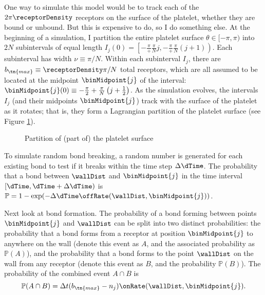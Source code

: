 One way to simulate this model would be to track each of the
$2\pi \receptorDensity$ receptors on the surface of the platelet,
whether they are bound or unbound. But this is expensive to do, so I
do something else. At the beginning of a simulation, I partition the
entire platelet surface $\theta \in [-\pi, \pi)$ into $2N$
subintervals of equal length
$I_j(0) = \left[-\frac{\pi} + \frac{\pi}{N}j, -\frac{\pi} +
  \frac{\pi}{N} (j+1)\right)$. Each subinterval has width
$\nu \equiv \pi/N$. Within each subinterval $I_j$, there are
$b_\tn{max} \equiv \receptorDensity \pi/N$ total receptors, which are
all assumed to be located at the midpoint $\binMidpoint{j}$ of the
interval:
$\binMidpoint{j}(0) \equiv -\frac{\pi}{2} + \frac{\pi}{N} \left( j +
  \frac{1}{2} \right)$. As the simulation evolves, the intervals $I_j$
(and their midpoints $\binMidpoint{j}$) track with the surface of the
platelet as it rotates; that is, they form a Lagrangian partition of
the platelet surface (see Figure \ref{fig:plt-bins}).

\begin{figure}
  \centering
  
  \caption{Partition of (part of) the platelet surface}
  \label{fig:plt-bins}
\end{figure}

To simulate random bond breaking, a random number is generated for
each existing bond to test if it breaks within the time step
$\Delta \dTime$. The probability that a bond between $\wallDist$ and
$\binMidpoint{j}$ in the time interval $[\dTime, \dTime + \Delta \dTime)$
is $\mathbb{P} = 1 - \exp(-\Delta \dTime \offRate(\wallDist,
\binMidpoint{j}))$.

Next look at bond formation. The probability of a bond forming between
points $\binMidpoint{j}$ and $\wallDist$ can be split into two distinct
probabilities: the probability that a bond forms from a receptor at
position $\binMidpoint{j}$ to anywhere on the wall (denote this event as
$A$, and the associated probability as $\mathbb{P}(A)$), and the
probability that a bond forms to the point $\wallDist$ on the wall
from any receptor (denote this event as $B$, and the probability
$\mathbb{P}(B)$). The probability of the combined event $A \cap B$ is
\begin{equation}
  \label{eq:joint-prob}
  \mathbb{P}(A \cap B) = \Delta t (b_\tn{max} - n_j)
  \onRate(\wallDist, \binMidpoint{j}).
\end{equation}



